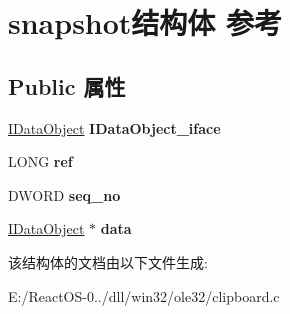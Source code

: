 \hypertarget{structsnapshot}{}\section{snapshot结构体 参考}
\label{structsnapshot}
\subsection*{Public 属性}
\begin{DoxyCompactItemize}
\item 
\mbox{\label{structsnapshot_a4c111d3179a253329bfa5e2438c197b3}} 
\hyperlink{interface_i_data_object}{I\+Data\+Object} {\bfseries I\+Data\+Object\+\_\+iface}
\item 
\mbox{\label{structsnapshot_aca9adcf228ba9a8d79e8ef858133f146}} 
L\+O\+NG {\bfseries ref}
\item 
\mbox{\label{structsnapshot_abeb5ea1d047564183c51376c6b7775f8}} 
D\+W\+O\+RD {\bfseries seq\+\_\+no}
\item 
\mbox{\label{structsnapshot_a4afbbe7fa280299d7898924855d16828}} 
\hyperlink{interface_i_data_object}{I\+Data\+Object} $\ast$ {\bfseries data}
\end{DoxyCompactItemize}


该结构体的文档由以下文件生成\+:\begin{DoxyCompactItemize}
\item 
E\+:/\+React\+O\+S-\/0../dll/win32/ole32/clipboard.\+c\end{DoxyCompactItemize}
